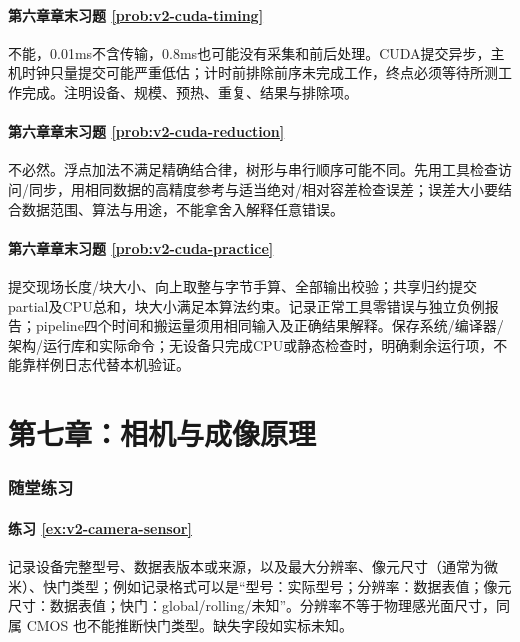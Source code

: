 \paragraph*{第六章章末习题 \ref{prob:v2-cuda-timing}}
\begin{solution}
不能，0.01ms不含传输，0.8ms也可能没有采集和前后处理。CUDA提交异步，主机时钟只量提交可能严重低估；计时前排除前序未完成工作，终点必须等待所测工作完成。注明设备、规模、预热、重复、结果与排除项。
\end{solution}

\paragraph*{第六章章末习题 \ref{prob:v2-cuda-reduction}}
\begin{solution}
不必然。浮点加法不满足精确结合律，树形与串行顺序可能不同。先用工具检查访问/同步，用相同数据的高精度参考与适当绝对/相对容差检查误差；误差大小要结合数据范围、算法与用途，不能拿舍入解释任意错误。
\end{solution}

\paragraph*{第六章章末习题 \ref{prob:v2-cuda-practice}}
\begin{solution}
提交现场长度/块大小、向上取整与字节手算、全部输出校验；共享归约提交partial及CPU总和，块大小满足本算法约束。记录正常工具零错误与独立负例报告；pipeline四个时间和搬运量须用相同输入及正确结果解释。保存系统/编译器/架构/运行库和实际命令；无设备只完成CPU或静态检查时，明确剩余运行项，不能靠样例日志代替本机验证。
\end{solution}

\section*{第七章：相机与成像原理}
{}
\subsubsection*{随堂练习}

\paragraph*{练习 \ref{ex:v2-camera-sensor}}
\begin{solution}
记录设备完整型号、数据表版本或来源，以及最大分辨率、像元尺寸（通常为微米）、快门类型；例如记录格式可以是“型号：实际型号；分辨率：数据表值；像元尺寸：数据表值；快门：global/rolling/未知”。分辨率不等于物理感光面尺寸，同属 CMOS 也不能推断快门类型。缺失字段如实标未知。
\end{solution}

